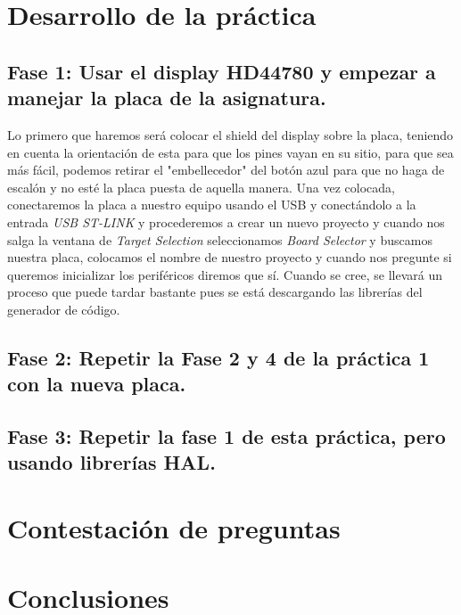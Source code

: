 \documentclass[11pt,a4paper]{article}
\begin{document}
	\section{Desarrollo de la práctica}
	\subsection{Fase 1: Usar el display HD44780 y empezar a manejar la placa de la asignatura.}
	Lo primero que haremos será colocar el shield del display sobre la placa, teniendo en cuenta la orientación de esta para que los pines vayan en su sitio, para que sea más fácil, podemos retirar el "embellecedor" del botón azul para que no haga de escalón y no esté la placa puesta de aquella manera. Una vez colocada, conectaremos la placa a nuestro equipo usando el USB y conectándolo a la entrada \textit{USB ST-LINK} y procederemos a crear un nuevo proyecto y cuando nos salga la ventana de \textit{Target Selection} seleccionamos \textit{Board Selector} y buscamos nuestra placa, colocamos el nombre de nuestro proyecto y cuando nos pregunte si queremos inicializar los periféricos diremos que sí. Cuando se cree, se llevará un proceso que puede tardar bastante pues se está descargando las librerías del generador de código.
	
	\subsection{Fase 2: Repetir la Fase 2 y 4 de la práctica 1 con la nueva placa.}
	
	\subsection{Fase 3: Repetir la fase 1 de esta práctica, pero usando librerías HAL.}

	\section{Contestación de preguntas}
	
	\section{Conclusiones}
\end{document}
